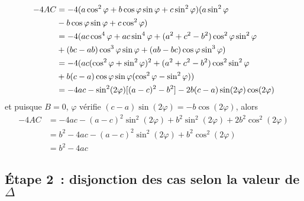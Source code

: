 \begin{align}
  -4AC&=-4(a\cos^2\varphi+b\cos\varphi\sin\varphi +c\sin^2\varphi)(a\sin^2\varphi \\ &- b\cos\varphi\sin\varphi +c\cos^2\varphi) \notag\\
  &=-4(ac\cos^4\varphi + ac\sin^4\varphi+(a^2+c^2-b^2)\cos^2\varphi\sin^2\varphi\\ & +(bc-ab)\cos^3\varphi\sin\varphi+(ab-bc)\cos\varphi\sin^3\varphi) \notag\\
  &=-4(ac(\cos^2\varphi+\sin^2\varphi)^2+(a^2+c^2-b^2)\cos^2\sin^2\varphi \\ & +b(c-a)\cos\varphi\sin\varphi(\cos^2\varphi-\sin^2\varphi)) \notag\\
  &=-4ac-\sin^2(2\varphi)[(a-c)^2-b^2]-2b(c-a)\sin(2\varphi)\cos(2\varphi)
\end{align}
et puisque \(B=0\), \(\varphi\) vérifie \((c-a)\sin(2\varphi)=-b\cos(2\varphi)\), alors
\begin{align}
  -4AC&=-4ac-(a-c)^2\sin^2(2\varphi)+b^2\sin^2(2\varphi)+2b^2\cos^2(2\varphi)\\
  &=b^2-4ac-(a-c)^2\sin^2(2\varphi)+b^2\cos^2(2\varphi)\\
  &=b^2-4ac
\end{align}

\subsection{Étape 2~: disjonction des cas selon la valeur de \(\Delta\)}

